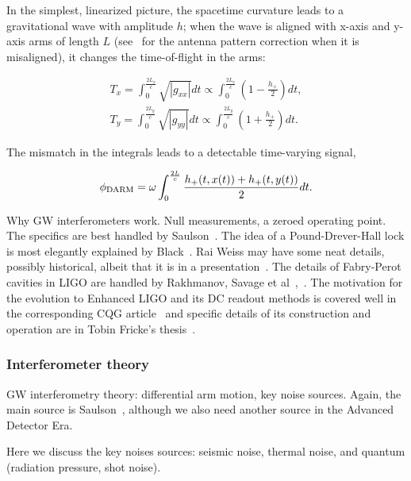 In the simplest, linearized picture, the spacetime curvature leads to a gravitational wave with amplitude $h$; when the wave is aligned with x-axis and y-axis arms of length $L$ (see~\cite{Jaranowski1998} for the antenna pattern correction when it is misaligned), it changes the time-of-flight in the arms:

\begin{eqnarray}
T_x = \int_0^{\frac{2L_x}{c}} \sqrt{|g_{xx}|} dt \propto \int_0^{\frac{2L_x}{c}} \left(1 - \frac{h_+}{2} \right) dt, \\
T_y = \int_0^{\frac{2L_y}{c}} \sqrt{|g_{yy}|} dt \propto \int_0^{\frac{2L_y}{c}} \left(1 + \frac{h_+}{2} \right) dt.
\end{eqnarray}

\noindent The mismatch in the integrals leads to a detectable time-varying signal,

\begin{equation}
\phi_{\textup{DARM}} = \omega \int_0^{\frac{2L}{c}} \frac{h_+ (t, x(t)) + h_+ (t, y(t))}{2} dt.
\end{equation}  



            Why GW interferometers work. Null measurements, a zeroed operating point. The specifics are best handled by Saulson~\cite{Saulson}. The idea of a Pound-Drever-Hall lock is most elegantly explained by Black~\cite{PDHNotes}. Rai Weiss may have some neat details, possibly historical, albeit that it is in a presentation~\cite{LIGOWorks}. The details of Fabry-Perot cavities in LIGO are handled by Rakhmanov, Savage et al~\cite{ResonanceFP},~\cite{ResponsesFP}. The motivation for the evolution to Enhanced LIGO and its DC readout methods is covered well in the corresponding CQG article~\cite{Fricke2009} and specific details of its construction and operation are in Tobin Fricke's thesis~\cite{FrickeThesis}.

            \subsubsection{Interferometer theory}
            \label{interferometer_theory}
        
                GW interferometry theory: differential arm motion, key noise sources. Again, the main source is Saulson~\cite{Saulson}, although we also need another source in the Advanced Detector Era.

                Here we discuss the key noises sources: seismic noise, thermal noise, and quantum (radiation pressure, shot noise).

